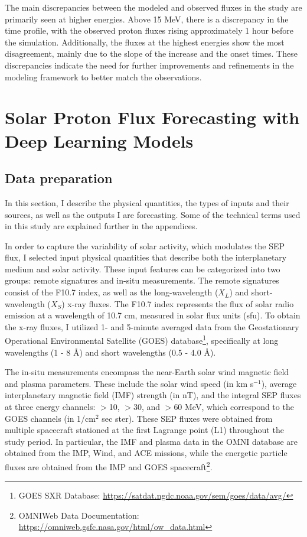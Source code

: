 The main discrepancies between the modeled and observed fluxes in the study are primarily seen at higher energies. Above 15 MeV, there is a discrepancy in the time profile, with the observed proton fluxes rising approximately 1 hour before the simulation. Additionally, the fluxes at the highest energies show the most disagreement, mainly due to the slope of the increase and the onset times. These discrepancies indicate the need for further improvements and refinements in the modeling framework to better match the observations.

\section{Solar Proton Flux Forecasting with Deep Learning Models}
\subsection{Data preparation}
In this section, I describe the physical quantities, the types of inputs and their sources, as well as the outputs I are forecasting.
Some of the technical terms used in this study are explained further in the appendices.

In order to capture the variability of solar activity, which modulates the SEP flux, I selected input physical quantities that describe both the interplanetary medium and solar activity. These input features can be categorized into two groups: remote signatures and in-situ measurements.
The remote signatures consist of the F10.7 index, as well as the long-wavelength ($X_L$) and short-wavelength ($X_S$) x-ray fluxes. The F10.7 index represents the flux of solar radio emission at a wavelength of 10.7 cm, measured in solar flux units (sfu). To obtain the x-ray fluxes, I utilized 1- and 5-minute averaged data from the Geostationary Operational Environmental Satellite (GOES) database\footnote{GOES SXR Database: \url{https://satdat.ngdc.noaa.gov/sem/goes/data/avg/}}, specifically at long wavelengths (1 - 8 \AA) and short wavelengths (0.5 - 4.0 \AA).

The in-situ measurements encompass the near-Earth solar wind magnetic field and plasma parameters. These include the solar wind speed (in km s$^{-1}$), average interplanetary magnetic field (IMF) strength (in nT), and the integral SEP fluxes at three energy channels: $>$10, $>$30, and $>$60 MeV, which correspond to the GOES channels (in 1/cm$^2$ sec ster). These SEP fluxes were obtained from multiple spacecraft stationed at the first Lagrange point (L1) throughout the study period.
In particular, the IMF and plasma data in the OMNI database are obtained from the IMP, Wind, and ACE missions, while the energetic particle fluxes are obtained from the IMP and GOES spacecraft\footnote{OMNIWeb Data Documentation: \url{https://omniweb.gsfc.nasa.gov/html/ow_data.html}}.

